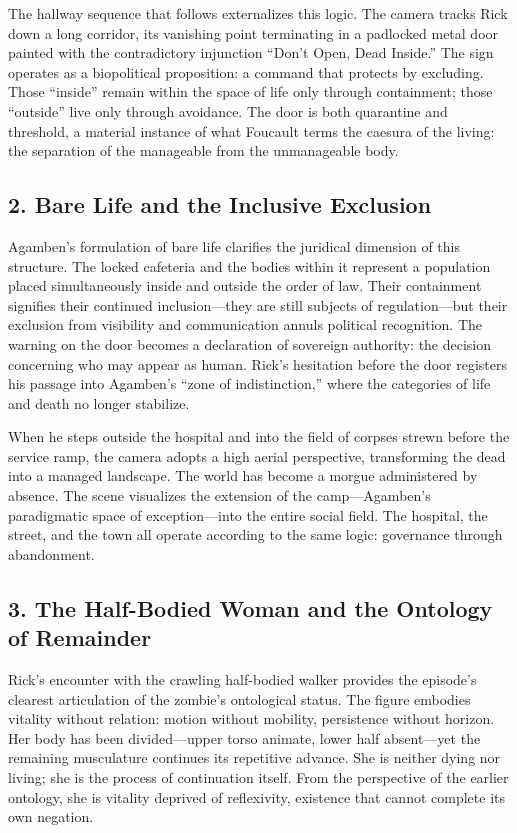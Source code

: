 \documentclass[11pt]{article}
\begin{document}
The hallway sequence that follows externalizes this logic.  The camera tracks Rick down a long corridor, its vanishing point terminating in a padlocked metal door painted with the contradictory injunction “Don’t Open, Dead Inside.”  The sign operates as a biopolitical proposition: a command that protects by excluding.  Those “inside” remain within the space of life only through containment; those “outside” live only through avoidance.  The door is both quarantine and threshold, a material instance of what Foucault terms the caesura of the living: the separation of the manageable from the unmanageable body.  
\subsection*{2. Bare Life and the Inclusive Exclusion}
\label{sec:org088c9b2}

Agamben’s formulation of bare life clarifies the juridical dimension of this structure.  The locked cafeteria and the bodies within it represent a population placed simultaneously inside and outside the order of law.  Their containment signifies their continued inclusion—they are still subjects of regulation—but their exclusion from visibility and communication annuls political recognition.  The warning on the door becomes a declaration of sovereign authority: the decision concerning who may appear as human.  Rick’s hesitation before the door registers his passage into Agamben’s “zone of indistinction,” where the categories of life and death no longer stabilize.  

When he steps outside the hospital and into the field of corpses strewn before the service ramp, the camera adopts a high aerial perspective, transforming the dead into a managed landscape.  The world has become a morgue administered by absence.  The scene visualizes the extension of the camp—Agamben’s paradigmatic space of exception—into the entire social field.  The hospital, the street, and the town all operate according to the same logic: governance through abandonment.  
\subsection*{3. The Half-Bodied Woman and the Ontology of Remainder}
\label{sec:orgdd1acc1}

Rick’s encounter with the crawling half-bodied walker provides the episode’s clearest articulation of the zombie’s ontological status.  The figure embodies vitality without relation: motion without mobility, persistence without horizon.  Her body has been divided—upper torso animate, lower half absent—yet the remaining musculature continues its repetitive advance.  She is neither dying nor living; she is the process of continuation itself.  From the perspective of the earlier ontology, she is vitality deprived of reflexivity, existence that cannot complete its own negation.  
\end{document}
